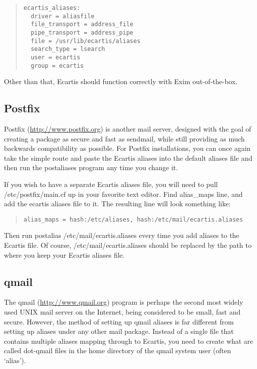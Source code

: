 \documentclass{book}
\begin{document}
\begin{quote}
\footnotesize
\begin{verbatim}
ecartis_aliases:
  driver = aliasfile
  file_transport = address_file
  pipe_transport = address_pipe
  file = /usr/lib/ecartis/aliases
  search_type = lsearch
  user = ecartis
  group = ecartis
\end{verbatim}
\end{quote}
   
Other than that, Ecartis should function correctly with Exim out-of-the-box.
   
\subsection{Postfix}
\label{starting:filters:postfix}
   
Postfix (\href{http://www.postfix.org}{http://www.postfix.org}) is another mail server, designed with
the goal of creating a package as secure and fast as sendmail, while still
providing as much backwards compatibility as possible.  For Postfix
installations, you can once again take the simple route and paste the Ecartis
aliases into the default aliases file and then run the postaliases program any
time you change it.
   
If you wish to have a separate Ecartis aliases file, you will need to pull
/etc/postfix/main.cf up in your favorite text editor.  Find alias\_maps line,
and add the ecartis aliases file to it.  The resulting line will look
something like:
   
\begin{quote}   
\footnotesize
\begin{verbatim}
alias_maps = hash:/etc/aliases, hash:/etc/mail/ecartis.aliases
\end{verbatim}
\end{quote}
   
Then run postalias /etc/mail/ecartis.aliases every time you add aliases to the
Ecartis file.  Of course, /etc/mail/ecartis.aliases should be replaced by the
path to where you keep your Ecartis aliases file.
   
\subsection{qmail}
\label{starting:filters:qmail}

The qmail (\href{http://www.qmail.org}{http://www.qmail.org}) program is perhaps the second most
widely used UNIX mail server on the Internet, being considered to be small,
fast and secure.  However, the method of setting up qmail aliases is far
different from setting up aliases under any other mail package.  Instead of a
single file that contains multiple aliases mapping through to Ecartis, you
need to create what are called dot-qmail files in the home directory of the
qmail system user (often `alias').
   
\end{document}
